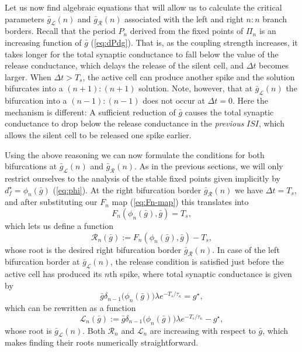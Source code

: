 \documentclass[utf8]{frontiersFPHY} %
\begin{document}
Let us now find algebraic equations that will allow us to calculate the critical parameters $\bar g_{\mathcal{L}}(n)$ and $\bar g_{\mathcal{R}}(n)$ associated with the left and right $n:n$ branch borders.
Recall that the period $P_n$ derived from the fixed points of $\Pi_n$ is an increasing function of $\bar g$ (\cref{eq:dPdg}).
That is, as the coupling strength increases, it takes longer for the total synaptic conductance to fall below the value of the release conductance, which delays the release of the silent cell, and $\Delta t$ becomes larger.
When $\Delta t > T_{s}$, the active cell can produce another spike and the solution bifurcates into a $(n+1):(n+1)$ solution.
Note, however, that at $\bar g_{\mathcal{L}}(n)$ the bifurcation into a $(n-1):(n-1)$ does not occur at $\Delta t = 0$.
Here the mechanism is different: A sufficient reduction of $\bar g$ causes the total synaptic conductance to drop below the release conductance in the \emph{previous} $ISI$, which allows the silent cell to be released one spike earlier.

Using the above reasoning we can now formulate the conditions for both bifurcations at $\bar g_{\mathcal{L}}(n)$ and $\bar g_{\mathcal{R}}(n)$.
As in the previous sections, we will only restrict ourselves to the analysis of the stable fixed points given implicitly by $d^\star_f=\phi_n(\bar g)$ (\cref{eq:phi}).
At the right bifurcation border $\bar g_{\mathcal{R}}(n)$ we have $\Delta t=T_{s}$, and after substituting our $F_n$ map (\cref{eq:Fn-map}) this translates into
\begin{equation}
	F_n(\phi_n(\bar g), \bar g) = T_{s},
\end{equation}
which lets us define a function
\begin{equation}
	\label{eq:R}
	\mathcal{R}_{n}(\bar g):=F_n(\phi_n(\bar g), \bar g)-T_{s},
\end{equation}
whose root is the desired right bifurcation border $\bar g_{\mathcal{R}}(n)$.
In case of the left bifurcation border at $\bar g_{\mathcal{L}}(n)$, the release condition is satisfied just before the active cell has produced its $n$th spike, where total synaptic conductance is given by
\begin{equation}
	\bar g \delta_{n-1}\big(\phi_n(\bar g)\big)\lambda e^{-T_{s}/\tau_\kappa} = g^\star,
\end{equation}
which can be rewritten as a function
\begin{equation}
	\label{eq:L}
	\mathcal{L}_n(\bar g):=\bar g \delta_{n-1}\big(\phi_n(\bar g)\big)\lambda e^{-T_{s}/\tau_\kappa} -g^\star,
\end{equation}
whose root is $\bar g_{\mathcal{L}}(n)$.
Both $\mathcal{R}_n$ and $\mathcal{L}_n$ are increasing with respect to $\bar g$, which makes finding their roots numerically straightforward.
\end{document}
